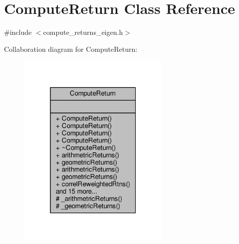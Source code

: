 \hypertarget{classComputeReturn}{}\section{Compute\+Return Class Reference}
\label{classComputeReturn}


{\ttfamily \#include $<$compute\+\_\+returns\+\_\+eigen.\+h$>$}



Collaboration diagram for Compute\+Return\+:
\nopagebreak
\begin{figure}[H]
\begin{center}
\leavevmode
\includegraphics[width=208pt]{classComputeReturn__coll__graph}
\end{center}
\end{figure}
